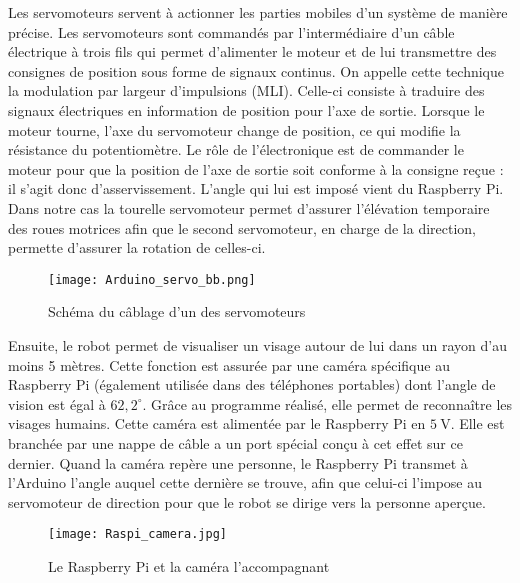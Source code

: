 \documentclass[12pt,a4paper]{article}
\begin{document}
Les servomoteurs servent à actionner les parties mobiles d’un système de manière précise. Les servomoteurs sont commandés par l’intermédiaire d’un câble électrique à trois fils qui permet d’alimenter le moteur et de lui transmettre des consignes de position sous forme de signaux continus. On appelle cette technique la modulation par largeur d’impulsions (MLI). Celle-ci consiste à traduire des signaux électriques en information de position pour l’axe de sortie. Lorsque le moteur tourne, l’axe du servomoteur change de position, ce qui modifie la résistance du potentiomètre. Le rôle de l’électronique est de commander le moteur pour que la position de l’axe de sortie soit conforme à la consigne reçue : il s’agit donc d’asservissement. L’angle qui lui est imposé vient du Raspberry Pi.
Dans notre cas la tourelle servomoteur permet d’assurer l’élévation temporaire des roues motrices afin que le second servomoteur, en charge de la direction, permette d’assurer la rotation de celles-ci.

	\begin{figure}[ht!]
		\centering
			\texttt{[image: Arduino\_servo\_bb.png]}
			\caption[Schéma du câblage d'un des servomoteurs - Illustration réalisée par notre groupe, disponible à l'adresse : \url{https://github.com/thaspdev/PATRICK/blob/master/circuits/Arduino_servo/Arduino_servo_bb.png}, ainsi qu'à cette adresse au format Fritzing : \url{https://github.com/thaspdev/PATRICK/blob/master/circuits/Arduino_servo/Arduino_servo.fzz}]{Schéma du câblage d'un des servomoteurs\label{overflow}}
	\end{figure}
	\newpage
	
	Ensuite, le robot permet de visualiser un visage autour de lui dans un rayon d’au moins 5 mètres. Cette fonction est assurée par une caméra spécifique au Raspberry Pi (également utilisée dans des téléphones portables) dont l’angle de vision est égal à $62,2^\circ$. Grâce au programme réalisé, elle permet de reconnaître les visages humains. Cette caméra est alimentée par le Raspberry Pi en $\SI{5}{\volt}$. Elle est branchée par une nappe de câble a un port spécial conçu à cet effet sur ce dernier. Quand la caméra repère une personne, le Raspberry Pi transmet à l’Arduino l’angle auquel cette dernière se trouve, afin que celui-ci l’impose au servomoteur de direction pour que le robot se dirige vers la personne aperçue.
	
	\begin{figure}[ht!]
		\centering
			\texttt{[image: Raspi\_camera.jpg]}
			\caption[Schéma du câblage du moteur à courant continu - Illustration réalisée par notre groupe, disponible à l'adresse : \url{https://github.com/thaspdev/PATRICK/blob/master/illustrations/Raspi_camera.jpg}]{Le Raspberry Pi et la caméra l'accompagnant\label{overflow}}
	\end{figure}
	\newpage
	
\end{document}
